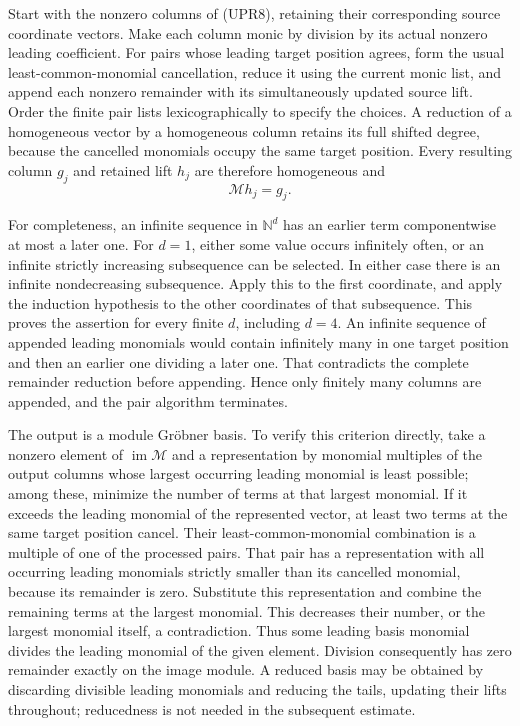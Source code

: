 Start with the nonzero columns of (UPR8), retaining their corresponding
source coordinate vectors.  Make each column monic by division by
its actual nonzero leading coefficient.  For pairs whose leading
target position agrees, form the usual least-common-monomial
cancellation, reduce it using the current monic list, and append
each nonzero remainder with its simultaneously updated source
lift.  Order the finite pair lists lexicographically to specify
the choices.  A reduction of a homogeneous vector by a homogeneous
column retains its full shifted degree, because the cancelled
monomials occupy the same target position.  Every resulting column
\(g_j\) and retained lift \(h_j\) are therefore homogeneous and
\[
\mathcal M h_j=g_j.
\tag{UPR10}
\]

For completeness, an infinite sequence in \(\mathbb N^d\) has an
earlier term componentwise at most a later one.  For \(d=1\), either
some value occurs infinitely often, or an infinite strictly
increasing subsequence can be selected.  In either case there is
an infinite nondecreasing subsequence.  Apply this to the first
coordinate, and apply the induction hypothesis to the other
coordinates of that subsequence.  This proves the assertion for
every finite \(d\), including \(d=4\).
An infinite sequence of appended leading monomials would contain
infinitely many in one target position and then an earlier one
dividing a later one.  That contradicts the complete remainder
reduction before appending.  Hence only finitely many columns are
appended, and the pair algorithm terminates.

The output is a module Gr\"obner basis.  To verify this criterion
directly, take a nonzero element of \(\operatorname{im}\mathcal M\)
and a representation by monomial multiples of the output columns
whose largest occurring leading monomial is least possible; among
these, minimize the number of terms at that largest monomial.
If it exceeds the leading monomial of the represented vector,
at least two terms at the same target position cancel.
Their least-common-monomial combination is a multiple of one of
the processed pairs.  That pair has a representation with all
occurring leading monomials strictly smaller than its cancelled
monomial, because its remainder is zero.  Substitute this
representation and combine the remaining terms at the largest
monomial.  This decreases their number, or the largest monomial
itself, a contradiction.  Thus some leading basis monomial divides
the leading monomial of the given element.  Division consequently
has zero remainder exactly on the image module.
A reduced basis may be obtained by discarding divisible leading
monomials and reducing the tails, updating their lifts throughout;
reducedness is not needed in the subsequent estimate.


